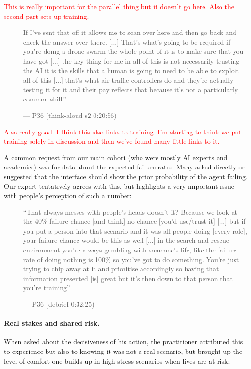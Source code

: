 \textcolor{red}{This is really important for the parallel thing but it doesn't go here. Also the second part sets up training.}
\begin{quote}\small
If I've sent that off it allows me to scan over here and then go back and check the answer over there. [...] That's what's going to be required if you're doing a drone swarm the whole point of it is to make sure that you have got [...] the key thing for me in all of this is not necessarily trusting the AI it is the skills that a human is going to need to be able to exploit all of this [...] that's what air traffic controllers do and they're actually testing it for it and their pay reflects that because it's not a particularly common skill.''\par\hfill--- P36 (think-aloud s2 0:20:56)
\end{quote}



\textcolor{red}{Also really good. I think this also links to training. I'm starting to think we put training solely in discussion and then we've found many little links to it.}

A common request from our main cohort (who were mostly AI experts and academics) was for data about the expected failure rates. Many asked directly or suggested that the interface should show the prior probability of the agent failing. Our expert tentatively agrees with this, but highlights a very important issue with people's perception of such a number:
\begin{quote}\small
``That always messes with people's heads doesn't it? Because we look at the 40\% failure chance [and think] no chance [you'd use/trust it] [...] but if you put a person into that scenario and it was all people doing [every role], your failure chance would be this as well [...] in the search and rescue environment you're always gambling with someone's life, like the failure rate of doing nothing is 100\% so you've got to do something. You're just trying to chip away at it and prioritise accordingly so having that information presented [is] great but it's then down to that person that you're training''\par\hfill--- P36 (debrief 0:32:25)
\end{quote}

\label{sec:qual:practitioner:pt-shared-risk}\paragraph{Real stakes and shared risk.}
When asked about the decisiveness of his action, the practitioner attributed this to experience but also to knowing it was not a real scenario, but brought up the level of comfort one builds up in high-stress scenarios when lives are at risk:

